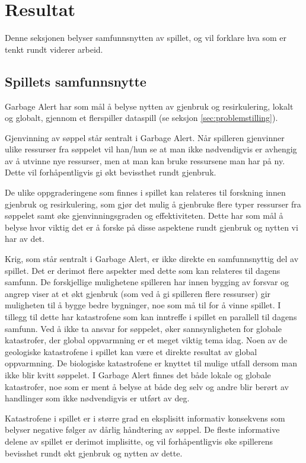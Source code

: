 \section{Resultat}\label{sec:conclusion}
Denne seksjonen belyser samfunnsnytten av spillet, og vil forklare hva
som er tenkt rundt viderer arbeid.
\subsection{Spillets samfunnsnytte}
Garbage Alert har som mål å belyse nytten av gjenbruk og resirkulering, lokalt og globalt, gjennom et flerspiller dataspill (se seksjon \ref{sec:problemstilling}).

Gjenvinning av søppel står sentralt i Garbage Alert. Når spilleren gjenvinner ulike ressurser fra søppelet vil han/hun se at man ikke nødvendigvis er avhengig av å utvinne nye ressurser, men at man kan bruke ressursene man har på ny. Dette vil forhåpentligvis gi økt bevissthet rundt gjenbruk.

De ulike oppgraderingene som finnes i spillet kan relateres til forskning innen gjenbruk og resirkulering, som gjør det mulig å gjenbruke flere typer ressurser fra søppelet samt øke gjenvinningsgraden og effektiviteten. Dette har som mål å belyse hvor viktig det er å forske på disse aspektene rundt gjenbruk og nytten vi har av det.

Krig, som står sentralt i Garbage Alert, er ikke direkte en samfunnsnyttig del av spillet. Det er derimot flere aspekter med dette som kan relateres til dagens samfunn. De forskjellige mulighetene spilleren har innen bygging av forsvar og angrep viser at et økt gjenbruk (som ved å gi spilleren flere ressurser) gir muligheten til å bygge bedre bygninger, noe som må til for å vinne spillet. I tillegg til dette har katastrofene som kan inntreffe i spillet en parallell til dagens samfunn. Ved å ikke ta ansvar for søppelet, øker sannsynligheten for globale katastrofer, der global oppvarmning er et meget viktig tema idag. Noen av de geologiske katastrofene i spillet kan være et direkte resultat av global oppvarmning. De biologiske katastrofene er knyttet til mulige utfall dersom man ikke blir kvitt søppelet. I Garbage Alert finnes det både lokale og globale katastrofer, noe som er ment å belyse at både deg selv og andre blir berørt av handlinger som ikke nødvendigvis er utført av deg.

Katastrofene i spillet er i større grad en eksplisitt informativ konsekvens som belyser negative følger av dårlig håndtering av søppel. De fleste informative delene av spillet er derimot implisitte, og vil forhåpentligvis øke spillerens bevisshet rundt økt gjenbruk og nytten av dette. 


